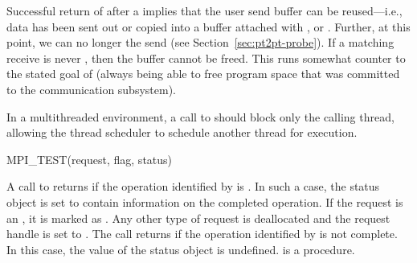 \begin{users}
Successful return of  after a  implies
that the user send buffer can be reused---i.e., data has been sent
out or copied into a
buffer attached with ,  or .
Further, at this point,
we can no longer  the send (see Section~\ref{sec:pt2pt-probe}).
If a matching receive is never
, then the buffer cannot be freed.  This runs somewhat
counter to the stated goal of  (always being able to free
program space that was committed to the communication subsystem).
\end{users}

\begin{implementors}
In a multithreaded environment, a call to
 should block only the calling thread, allowing the thread
scheduler to schedule another thread for execution.
\end{implementors}

\begin{funcdef}{MPI\_TEST}{(\mbox{request}, \mbox{flag}, \mbox{status})}
\end{funcdef}

A call to  returns  if the
operation identified by  is .  In such a case, the
status object is set to contain information on the completed
operation.  If the request is an  ,
it is marked as .  Any other type of request
is deallocated and the request handle is set to
. The call returns
 if the operation identified by
 is not complete.
In this case, the value
of the status object is undefined.
 is a  procedure.


